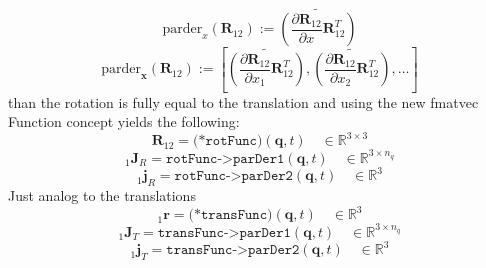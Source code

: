 \documentclass{report}
\newcommand{\bs}[1]{\boldsymbol #1}
\begin{document}
\begin{equation}
\text{parder}_x(\bs{R}_{12}):=\widetilde{\left(\frac{\partial\bs{R}_{12}}{\partial x}\bs{R}_{12}^T\right)}
\end{equation}
\begin{equation}
\text{parder}_{\bs{x}}(\bs{R}_{12}):=\left[\widetilde{\left(\frac{\partial\bs{R}_{12}}{\partial x_1}\bs{R}_{12}^T\right)},\widetilde{\left(\frac{\partial\bs{R}_{12}}{\partial x_2}\bs{R}_{12}^T\right)},\dots\right]
\end{equation}
than the rotation is fully equal to the translation and using the new fmatvec Function concept yields the following:
\begin{equation}
\bs{R}_{12}=\texttt{(*rotFunc)}(\bs{q},t)\quad\in\mathbb{R}^{3\times 3}
\end{equation}
\begin{equation}
_1\bs{J}_R=\texttt{rotFunc->parDer1}(\bs{q},t)\quad\in\mathbb{R}^{3\times n_q}
\end{equation}
\begin{equation}
_1\bs{j}_R=\texttt{rotFunc->parDer2}(\bs{q},t)\quad\in\mathbb{R}^3
\end{equation}
Just analog to the translations
\begin{equation}
_1\bs{r}=\texttt{(*transFunc)}(\bs{q},t)\quad\in\mathbb{R}^3
\end{equation}
\begin{equation}
_1\bs{J}_T=\texttt{transFunc->parDer1}(\bs{q},t)\quad\in\mathbb{R}^{3\times n_q}
\end{equation}
\begin{equation}
_1\bs{j}_T=\texttt{transFunc->parDer2}(\bs{q},t)\quad\in\mathbb{R}^3
\end{equation}
\end{document}
